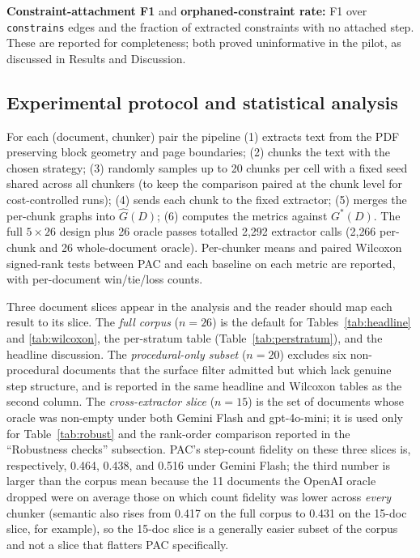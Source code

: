 \documentclass[fleqn,10pt]{wlscirep}
\begin{document}
\textbf{Constraint-attachment F1} and \textbf{orphaned-constraint
rate:} F1 over \texttt{constrains} edges and the fraction of extracted
constraints with no attached step. These are reported for
completeness; both proved uninformative in the pilot, as discussed in
Results and Discussion.

\subsection*{Experimental protocol and statistical analysis}

For each (document, chunker) pair the pipeline (1) extracts text from
the PDF preserving block geometry and page boundaries; (2) chunks the
text with the chosen strategy; (3) randomly samples up to 20 chunks
per cell with a fixed seed shared across all chunkers (to keep the
comparison paired at the chunk level for cost-controlled runs);
(4) sends each chunk to the fixed extractor; (5) merges the per-chunk
graphs into $\hat{G}(D)$; (6) computes the metrics against
$G^{*}(D)$. The full $5\times26$ design plus 26 oracle passes
totalled 2{,}292 extractor calls (2{,}266 per-chunk and 26
whole-document oracle). Per-chunker means and paired Wilcoxon
signed-rank tests between PAC and each baseline on each metric are
reported, with per-document win/tie/loss counts.

Three document slices appear in the analysis and the reader should map
each result to its slice. The \emph{full corpus} ($n=26$) is the
default for Tables~\ref{tab:headline} and \ref{tab:wilcoxon}, the
per-stratum table (Table~\ref{tab:perstratum}), and the headline
discussion. The \emph{procedural-only subset} ($n=20$) excludes six
non-procedural documents that the surface filter admitted but which
lack genuine step structure, and is reported in the same headline and
Wilcoxon tables as the second column. The \emph{cross-extractor slice}
($n=15$) is the set of documents whose oracle was non-empty under both
Gemini Flash and gpt-4o-mini; it is used only for
Table~\ref{tab:robust} and the rank-order comparison reported in the
``Robustness checks'' subsection. PAC's step-count fidelity on these
three slices is, respectively, 0.464, 0.438, and 0.516 under Gemini
Flash; the third number is larger than the corpus mean because the
11 documents the OpenAI oracle dropped were on average those on
which count fidelity was lower across \emph{every} chunker (semantic
also rises from 0.417 on the full corpus to 0.431 on the 15-doc
slice, for example), so the 15-doc slice is a generally easier subset
of the corpus and not a slice that flatters PAC specifically.
\end{document}
